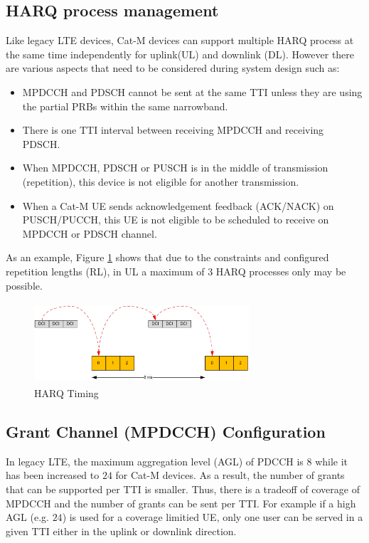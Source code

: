 \documentclass[conference,compsoc]{IEEEtran}
\begin{document}
\subsection{HARQ process management}
Like legacy LTE devices, Cat-M devices can support multiple HARQ process at the same time independently for uplink(UL) and downlink (DL). However there are various aspects that need to be considered during system design such as:
\begin{itemize}
    \item{MPDCCH and PDSCH cannot be sent at the same TTI unless they are using the partial PRBs within the same narrowband.}
    \item{There is one TTI interval between receiving MPDCCH and receiving PDSCH.}
    \item{When MPDCCH, PDSCH or PUSCH is in the middle of transmission (repetition), this device is not eligible for another transmission.}
    \item{When a Cat-M UE sends acknowledgement feedback (ACK/NACK) on PUSCH/PUCCH, this UE is not eligible to be scheduled to receive on MPDCCH or PDSCH channel.}
\end{itemize}
As an example, Figure \ref{fig_harq_timing} shows that due to the constraints and configured repetition lengths (RL), in UL a maximum of $3$ HARQ processes only may be possible.



\begin{figure}[htbp]
\centerline{\includegraphics[height=30mm,width=80mm]{harq_timing.png}}
\caption{HARQ Timing}
\label{fig_harq_timing}
\end{figure}


\subsection{Grant Channel (MPDCCH) Configuration}
In legacy LTE, the maximum aggregation level (AGL) of PDCCH is $8$ while it has been increased to $24$ for Cat-M devices. As a result, the number of grants that can be supported per TTI is smaller. Thus, there is a tradeoff of coverage of MPDCCH and the number of grants can be sent per TTI. For example if a high AGL (e.g. $24$) is used for a coverage limitied UE, only one user can be served in a given TTI either in the uplink or downlink direction.
\end{document}
